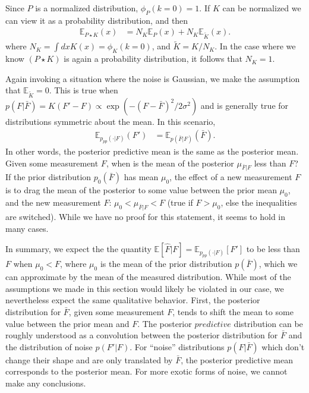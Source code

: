 \documentclass{article}
\begin{document}
Since $P$ is a normalized distribution, $\phi_P(k=0)=1$. If $K$ can be normalized we can view it as a probability distribution, and then
\begin{align*}
    \mathbb{E}_{P\star K} (x) &= N_K \mathbb{E}_{P} (x)  + N_K\mathbb{E}_{\tilde K}(x).
\end{align*}
where $N_K=\int dx K(x)=\phi_K(k=0)$, and $\tilde{K}=K/N_K$.
In the case where we know $(P\star K)$ is again a probability distribution, it follows that $N_K=1$.
\par 
Again invoking a situation where the noise is Gaussian, we make the  assumption that $\mathbb{E}_{\tilde K} = 0$. This is true when $p(F|\bar F) = K(F'-F)\propto \exp( -(F - \bar F)^2/2\sigma^2)$ and is generally true for distributions symmetric about the mean.
In this scenario, 
\begin{align*}
    \mathbb{E}_{p_{pp}(\cdot | F)} (F') &=\mathbb{E}_{p(\bar F | F)} (\bar F).
\end{align*}
In other words, the posterior predictive mean is the same as the posterior mean. 
Given some measurement $F$, when is the mean of the posterior $\mu_{\bar F | F}$ less than $F$?
If the prior distribution $p_0(\bar F)$ has mean $\mu_0$, the effect of a new measurement $F$ is to drag the mean of the posterior to some value between the prior mean $\mu_0$, and the new measurement $F$: $\mu_0 < \mu_{\bar F | F} < F$ (true if $F>\mu_0$, else the inequalities are switched).
While we have no proof for this statement, it seems to hold in many cases.
\par
In summary, we expect the the quantity $\mathbb{E}[\hat{F}|F]=\mathbb{E}_{p_{pp}(\cdot|F)}[F']$ to be less than $F$ when $\mu_0 < F$, where $\mu_0$ is the mean of the prior distribution $p(\bar F)$, which we can approximate by the mean of the measured distribution. 
While most of the assumptions we made in this section would likely be violated in our case, we nevertheless expect the same qualitative behavior. 
First, the posterior distribution for $\bar F$, given some measurement $F$, tends to shift the mean to some value between the prior mean and $F$.
The posterior $predictive$ distribution can be roughly understood as a convolution between the posterior distribution for $\bar F$ and the distribution of noise $p(F'|F)$. 
For ``noise'' distributions $p(F|\bar F)$ which don't change their shape and are only translated by $\bar F$, the posterior predictive mean corresponds to the posterior mean.
For more exotic forms of noise, we cannot make any conclusions. 
\end{document}
